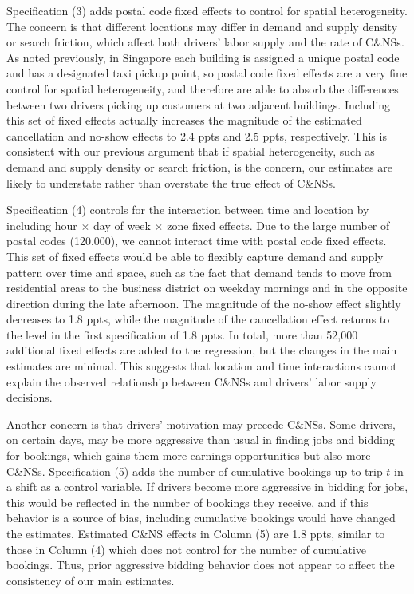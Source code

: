 \documentclass[reviewmode]{restud}
\begin{document}
Specification (3) adds postal code fixed effects to control for spatial heterogeneity. The concern is that different locations may differ in demand and supply density or search friction, which affect both drivers' labor supply and the rate of C\&NSs. As noted previously, in Singapore each building is assigned a unique postal code and has a designated taxi pickup point, so postal code fixed effects are a very fine control for spatial heterogeneity, and therefore are able to absorb the differences between two drivers picking up customers at two adjacent buildings. Including this set of fixed effects actually increases the magnitude of the estimated cancellation and no-show effects to 2.4 ppts and 2.5 ppts, respectively. This is consistent with our previous argument that if spatial heterogeneity, such as demand and supply density or search friction, is the concern, our estimates are likely to understate rather than overstate the true effect of C\&NSs.

Specification (4) controls for the interaction between time and location by including hour $\times$ day of week $\times$ zone fixed effects. Due to the large number of postal codes (120,000), we cannot interact time with postal code fixed effects. 
This set of fixed effects would be able to flexibly capture demand and supply pattern over time and space, such as the fact that demand tends to move from residential areas to the business district on weekday mornings and in the opposite direction during the late afternoon. The magnitude of the no-show effect slightly decreases to 1.8 ppts, while the magnitude of the cancellation effect returns to the level in the first specification of 1.8 ppts. In total, more than 52,000 additional fixed effects are added to the regression, but the changes in the main estimates are minimal. This suggests that location and time interactions cannot explain the observed relationship between C\&NSs and drivers' labor supply decisions.

Another concern is that drivers' motivation may precede C\&NSs. Some drivers, on certain days, may be more aggressive than usual in finding jobs and bidding for bookings, which gains them more earnings opportunities but also more C\&NSs. Specification (5) adds the number of cumulative bookings up to trip $t$ in a shift as a control variable. If drivers become more aggressive in bidding for jobs, this would be reflected in the number of bookings they receive, and if this behavior is a source of bias, including cumulative bookings would have changed the estimates. Estimated C\&NS effects in Column (5) are 1.8 ppts, similar to those in Column (4) which does not control for the number of cumulative bookings. Thus, prior aggressive bidding behavior does not appear to affect the consistency of our main estimates.
\end{document}
